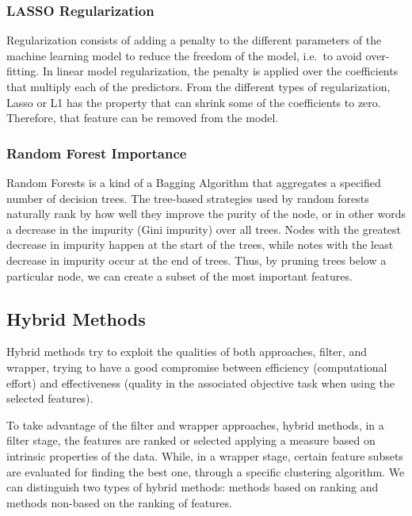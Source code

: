 \documentclass[
]{article}
\begin{document}
\hypertarget{lasso-regularization}{%
\subsubsection{LASSO Regularization}\label{lasso-regularization}}

Regularization consists of adding a penalty to the different parameters
of the machine learning model to reduce the freedom of the model,
i.e.~to avoid over-fitting. In linear model regularization, the penalty
is applied over the coefficients that multiply each of the predictors.
From the different types of regularization, Lasso or L1 has the property
that can shrink some of the coefficients to zero. Therefore, that
feature can be removed from the model.

\hypertarget{random-forest-importance}{%
\subsubsection{Random Forest
Importance}\label{random-forest-importance}}

Random Forests is a kind of a Bagging Algorithm that aggregates a
specified number of decision trees. The tree-based strategies used by
random forests naturally rank by how well they improve the purity of the
node, or in other words a decrease in the impurity (Gini impurity) over
all trees. Nodes with the greatest decrease in impurity happen at the
start of the trees, while notes with the least decrease in impurity
occur at the end of trees. Thus, by pruning trees below a particular
node, we can create a subset of the most important features.

\hypertarget{hybrid-methods}{%
\subsection{Hybrid Methods}\label{hybrid-methods}}

Hybrid methods try to exploit the qualities of both approaches, filter,
and wrapper, trying to have a good compromise between efficiency
(computational effort) and effectiveness (quality in the associated
objective task when using the selected features).

To take advantage of the filter and wrapper approaches, hybrid methods,
in a filter stage, the features are ranked or selected applying a
measure based on intrinsic properties of the data. While, in a wrapper
stage, certain feature subsets are evaluated for finding the best one,
through a specific clustering algorithm. We can distinguish two types of
hybrid methods: methods based on ranking and methods non-based on the
ranking of features.
\end{document}
